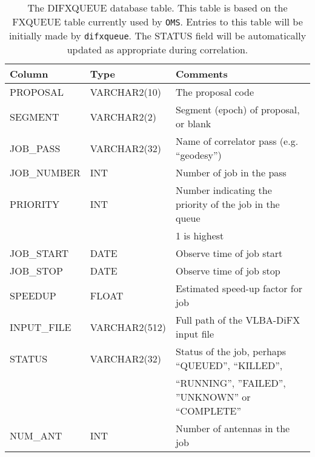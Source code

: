 \begin{table}[h]
\vspace{2mm}
\begin{center}
\renewcommand{\tabcolsep}{1.4mm}
\begin{tabular}{lll}
\hline
\hline
   \multicolumn{1}{l}{Column}
 & \multicolumn{1}{l}{Type}
 & \multicolumn{1}{l}{Comments}
\\
\hline
PROPOSAL	& VARCHAR2(10)	& The proposal code \\
SEGMENT		& VARCHAR2(2)	& Segment (epoch) of proposal, or blank \\
JOB\_PASS	& VARCHAR2(32)	& Name of correlator pass (e.g. ``geodesy'') \\
JOB\_NUMBER	& INT		& Number of job in the pass \\
PRIORITY	& INT		& Number indicating the priority of the job in the queue \\
		&		& 1 is highest \\
JOB\_START	& DATE		& Observe time of job start \\
JOB\_STOP	& DATE		& Observe time of job stop \\
SPEEDUP         & FLOAT         & Estimated speed-up factor for job \\
INPUT\_FILE	& VARCHAR2(512)	& Full path of the VLBA-DiFX input file \\
STATUS		& VARCHAR2(32)	& Status of the job, perhaps ``QUEUED'', ``KILLED'', \\
		&		& ``RUNNING'', ''FAILED'', ''UNKNOWN'' or ``COMPLETE'' \\
NUM\_ANT	& INT		& Number of antennas in the job \\
\hline
\end{tabular}
\end{center}
\caption{
The DIFXQUEUE database table.
This table is based on the FXQUEUE table currently used by {\tt OMS}.
Entries to this table will be initially made by {\tt difxqueue}.
The STATUS field will be automatically updated as appropriate during correlation.
\label{tab:difxqueue}}
\end{table}

